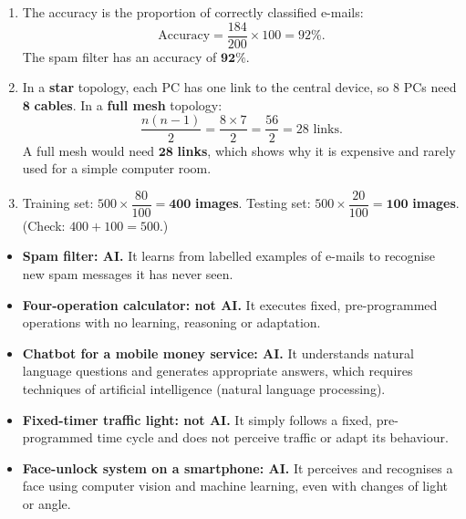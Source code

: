 \documentclass[11pt]{article}
\begin{document}
\begin{corrige}
\begin{enumerate}
\item The accuracy is the proportion of correctly classified e-mails:
\[ \text{Accuracy} = \frac{184}{200}\times 100 = 92\%. \]
The spam filter has an accuracy of $\mathbf{92\%}$.
\item In a \textbf{star} topology, each PC has one link to the central device, so $8$ PCs need $\mathbf{8}$ \textbf{cables}. In a \textbf{full mesh} topology:
\[ \frac{n(n-1)}{2} = \frac{8\times 7}{2} = \frac{56}{2} = 28 \text{ links}. \]
A full mesh would need $\mathbf{28}$ \textbf{links}, which shows why it is expensive and rarely used for a simple computer room.
\item Training set: $500 \times \dfrac{80}{100} = \mathbf{400}$ \textbf{images}. Testing set: $500 \times \dfrac{20}{100} = \mathbf{100}$ \textbf{images}. (Check: $400 + 100 = 500$.)
\end{enumerate}
\end{corrige}

\begin{corrige}
\begin{itemize}
\item \textbf{Spam filter: AI.} It learns from labelled examples of e-mails to recognise new spam messages it has never seen.
\item \textbf{Four-operation calculator: not AI.} It executes fixed, pre-programmed operations with no learning, reasoning or adaptation.
\item \textbf{Chatbot for a mobile money service: AI.} It understands natural language questions and generates appropriate answers, which requires techniques of artificial intelligence (natural language processing).
\item \textbf{Fixed-timer traffic light: not AI.} It simply follows a fixed, pre-programmed time cycle and does not perceive traffic or adapt its behaviour.
\item \textbf{Face-unlock system on a smartphone: AI.} It perceives and recognises a face using computer vision and machine learning, even with changes of light or angle.
\end{itemize}
\end{corrige}
\end{document}
